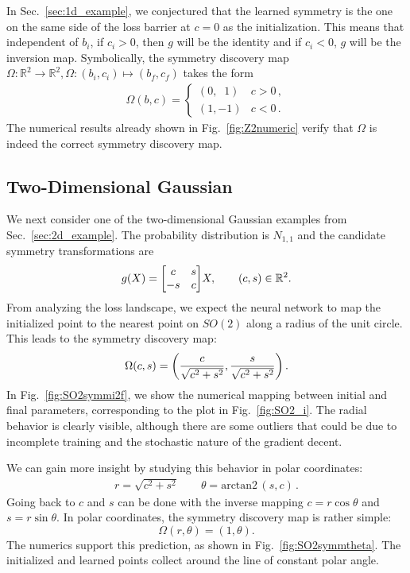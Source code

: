 \documentclass[aps,prx,reprint,preprintnumbers,superscriptaddress,nofootinbib,longbibliography,floatfix]{revtex4-1}
\newcommand{\R}{\mathbb{R}}
\DeclareRobustCommand{\Sec}[1]{Sec.~\ref{sec:#1}}
\DeclareRobustCommand{\Fig}[1]{Fig.~\ref{fig:#1}}
\begin{document}
In \Sec{1d_example}, we conjectured that the learned symmetry is the one on the same side of the loss barrier at $c = 0$ as the initialization.
%
This means that independent of $b_i$, if $c_i >0$, then $g$ will be the identity and if $c_i < 0$, $g$ will be the inversion map.
%
Symbolically, the symmetry discovery map $\Omega:\R^2\to\R^2, \Omega: (b_i, c_i)\mapsto (b_f, c_f)$ takes the form
\begin{align}
\Omega(b, c) = \begin{cases}(0,\;\;1)& c > 0 \, ,\\ (1, -1) & c < 0 \,.
\end{cases}
\end{align}
%
The numerical results already shown in \Fig{Z2numeric} verify that $\Omega$ is indeed the correct symmetry discovery map.

\subsection{Two-Dimensional Gaussian}

We next consider one of the two-dimensional Gaussian examples from \Sec{2d_example}.
%
The probability distribution is $N_{1,1}$ and the candidate symmetry transformations are 
%
\begin{equation}
    g(X) = \mqty[c&s\\-s&c]X, \qquad (c, s)\in\R^2.
\end{equation}
%
From analyzing the loss landscape, we expect the neural network to map the initialized point to the nearest point on $SO(2)$ along a radius of the unit circle.
%
This leads to the symmetry discovery map:
%
\begin{align}
\Omega(c, s) = \qty( \frac{c}{\sqrt{c^2 + s^2}}, \frac{s}{\sqrt{c^2 + s^2}})\,.
\end{align}
%
In \Fig{SO2symmi2f}, we show the numerical mapping between initial and final parameters, corresponding to the plot in \Fig{SO2_i}.
%
The radial behavior is clearly visible, although there are some outliers that could be due to incomplete training and the stochastic nature of the gradient decent. 


We can gain more insight by studying this behavior in polar coordinates: 
%
\begin{align}
r = \sqrt{c^2 + s^2}\qquad \theta = \text{arctan2}\,(s, c)\,.
\end{align}
%
%
Going back to $c$ and $s$ can be done with the inverse mapping $c = r\cos\theta$ and $s = r\sin\theta$.
%
In polar coordinates, the symmetry discovery map is rather simple:
%
\begin{equation}
\Omega(r, \theta) = (1, \theta).
\end{equation}
%
The numerics support this prediction, as shown in \Fig{SO2symmtheta}.
%
The initialized and learned points collect around the line of constant polar angle.
\end{document}
